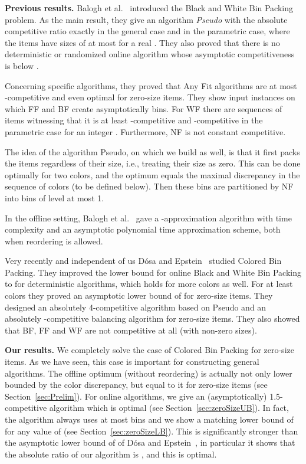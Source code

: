 \documentclass[11pt,a4paper]{article}
\begin{document}
\medskip

\textbf{Previous results.}
Balogh et al.~\cite{balogh13,balogh14} introduced the Black and White
Bin Packing problem.  As the main result, they give an algorithm
{\it Pseudo} with the absolute competitive ratio exactly  in the general
case and  in the parametric case, where the items
have sizes of at most  for a real .  They also proved
that there is no deterministic or randomized online algorithm whose
asymptotic competitiveness is below .

Concerning specific algorithms, they proved that Any Fit algorithms are at most
-competitive and even optimal for zero-size items.  They show input
instances on which FF and BF create asymptotically  bins.  For WF there are sequences of items witnessing that it
is at least -competitive and -competitive in
the parametric case for an integer .
Furthermore, NF is not constant competitive. 

The idea of the algorithm Pseudo, on which we build as well, is that
it first packs the items regardless of their size, i.e., treating their
size as zero. This can be done optimally for two colors, and the optimum equals the
maximal discrepancy in the sequence of colors (to be defined
below). Then these bins are partitioned by NF into bins of level at
most 1.

In the offline setting, Balogh et al.~\cite{balogh13} gave a -approximation
algorithm with  time complexity and an asymptotic
polynomial time approximation scheme, both when reordering is allowed.

Very recently and independent of us D\'osa and Epstein~\cite{DosEps14}
studied Colored Bin Packing. They improved the lower bound for online
Black and White Bin Packing to  for deterministic algorithms, 
which holds for more colors as well. For at least  colors they
proved an asymptotic lower bound of  for zero-size items.
They designed an absolutely 4-competitive algorithm based on Pseudo
and an absolutely -competitive balancing algorithm for
zero-size items. They also showed that BF, FF and WF are not
competitive at all (with non-zero sizes).

\medskip

\textbf{Our results.}
We completely solve the case of Colored Bin Packing for zero-size
items. As we have seen, this case is important for constructing
general algorithms.
The offline optimum (without reordering) is actually not only
lower bounded by the color discrepancy, but equal to it for zero-size
items (see Section~\ref{sec:Prelim}). For online
algorithms, we give an (asymptotically) 1.5-competitive algorithm
which is optimal (see Section~\ref{sec:zeroSizeUB}).
In fact, the algorithm always uses at most
 bins and we show a matching lower
bound of  for any value of
 (see Section~\ref{sec:zeroSizeLB}).
This is significantly stronger than the asymptotic
lower bound of  of D\'osa and Epstein~\cite{DosEps14}, in
particular it shows that the absolute ratio of our algorithm is ,
and this is optimal.
\end{document}
